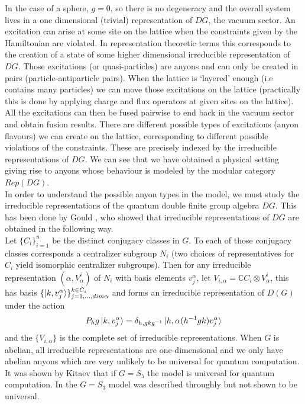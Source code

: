 \documentclass{article}
\begin{document}
In the case of a sphere, $g=0$, so there is no degeneracy and the overall system lives in a one dimensional (trivial) representation of $DG$, the vacuum sector. An excitation can arise at some site on the lattice when the constraints given by the Hamiltonian are violated. In representation theoretic terms this corresponds to the creation of a state of some higher dimensional irreducible representation of $DG$. Those excitations (or quasi-particles) are anyons and can only be created in pairs (particle-antiparticle pairs). When the lattice is `layered' enough (i.e contains many particles) we can move those excitations on the lattice (practically this is done by applying charge and flux operators at given sites on the lattice). All the excitations can then be fused pairwise to end back in the vacuum sector and obtain fusion results. There are different possible types of excitations (anyon flavours) we can create on the lattice, corresponding to different possible violations of the constraints. These are precisely indexed by the irreducible representations of $DG$. We can see that we have obtained a physical setting giving rise to anyons whose behaviour is modeled by the modular category $Rep(DG)$.\\
In order to understand the possible anyon types in the model, we must study the irreducible representations of the quantum double finite group algebra $DG$. This has been done by Gould \cite{Gould93}, who showed that irreducible representations of $DG$ are obtained in the following way.\\
Let $\{C_i\}_{i=1}^n$ be the distinct conjugacy classes in $G$. To each of those conjugacy classes corresponds a centralizer subgroup $N_i$ (two choices of representatives for $C_i$ yield isomorphic centralizer subgroups). Then for any irreducible representation $(\alpha,V^i_\alpha)$ of $N_i$ with basis elements $v^\alpha_j$, let $V_{i,\alpha} = \mathbb{C}C_i \otimes V^i_\alpha$, this has basis $\{ \ket{k,v^\alpha_j} \}_{j=1,...,dim\alpha}^{k\in C_i}$ and forms an irreducible representation of $D(G)$ under the action 
\begin{equation}
P_hg\ket{k,v^\alpha_j} = \delta_{h,gkg^{-1}} \ket{h,\alpha(h^{-1}gk)v^\alpha_j}
\end{equation}
and the $\{V_{i,\alpha}\}$ is the complete set of irreducible representations. When $G$ is abelian, all irreducible representations are one-dimensional and we only have abelian anyons which are very unlikely to be universal for quantum computation. It was shown by Kitaev that if $G=S_5$ the model is universal for quantum computation. In \cite{Lahtinen06} the $G=S_3$ model was described throughly but not shown to be universal.
\end{document}

